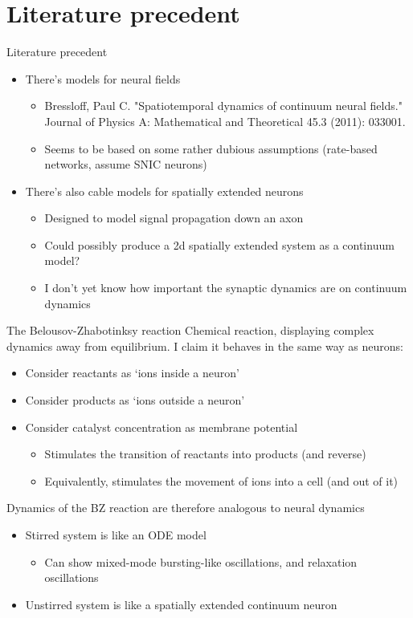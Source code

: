 \documentclass[presentation]{beamer}
\begin{document}
\section{Literature precedent}
\label{sec:org2aa1d8a}
\begin{frame}[label={sec:org0b38591}]{Literature precedent}
\begin{itemize}
\item There's models for neural fields
\begin{itemize}
\item Bressloff, Paul C. "Spatiotemporal dynamics of continuum neural fields." Journal of Physics A: Mathematical and Theoretical 45.3 (2011): 033001.
\item Seems to be based on some rather dubious assumptions (rate-based networks, assume SNIC neurons)
\end{itemize}
\item There's also cable models for spatially extended neurons
\begin{itemize}
\item Designed to model signal propagation down an axon
\item Could possibly produce a 2d spatially extended system as a continuum model?
\item I don't yet know how important the synaptic dynamics are on continuum dynamics
\end{itemize}
\end{itemize}
\end{frame}
\begin{frame}[label={sec:org5626252}]{The Belousov-Zhabotinksy reaction}
Chemical reaction, displaying complex dynamics away from equilibrium.
I claim it behaves in the same way as neurons:
\begin{itemize}
\item Consider reactants as `ions inside a neuron'
\item Consider products as `ions outside a neuron'
\item Consider catalyst concentration as membrane potential
\begin{itemize}
\item Stimulates the transition of reactants into products (and reverse)
\item Equivalently, stimulates the movement of ions into a cell (and out of it)
\end{itemize}
\end{itemize}
Dynamics of the BZ reaction are therefore analogous to neural dynamics
\begin{itemize}
\item Stirred system is like an ODE model
\begin{itemize}
\item Can show mixed-mode bursting-like oscillations, and relaxation oscillations
\end{itemize}
\item Unstirred system is like a spatially extended continuum neuron
\end{itemize}
\end{frame}
\end{document}
